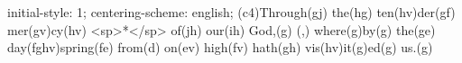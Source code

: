 initial-style: 1;
centering-scheme: english;
(c4)Through(gj) the(hg) ten(hv)der(gf) mer(gv)cy(hv) <sp>*</sp> of(jh) our(ih) God,(g) (,) where(g)by(g) the(ge) day(fghv)spring(fe) from(d) on(ev) high(fv) hath(gh) vis(hv)it(g)ed(g) us.(g)

